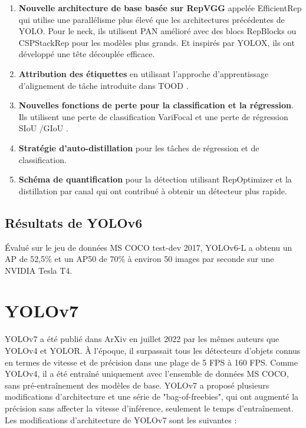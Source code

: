 \documentclass{article}
\begin{document}
\begin{enumerate}
    \item \textbf{Nouvelle architecture de base basée sur RepVGG} \cite{87} appelée EfficientRep qui utilise une parallélisme plus élevé que les architectures précédentes de YOLO. Pour le neck, ils utilisent PAN \cite{62} amélioré avec des blocs RepBlocks \cite{87} ou CSPStackRep \cite{61} pour les modèles plus grands. Et inspirés par YOLOX, ils ont développé une tête découplée efficace.
    \item \textbf{Attribution des étiquettes} en utilisant l'approche d'apprentissage d'alignement de tâche introduite dans TOOD \cite{88}.
    \item \textbf{Nouvelles fonctions de perte pour la classification et la régression}. Ils utilisent une perte de classification VariFocal \cite{89} et une perte de régression SIoU \cite{90}/GIoU \cite{91}.
    \item \textbf{Stratégie d'auto-distillation} pour les tâches de régression et de classification.
    \item \textbf{Schéma de quantification} pour la détection utilisant RepOptimizer \cite{92} et la distillation par canal \cite{93} qui ont contribué à obtenir un détecteur plus rapide.
\end{enumerate}

\subsection{Résultats de YOLOv6}
Évalué sur le jeu de données MS COCO test-dev 2017, YOLOv6-L a obtenu un AP de 52,5\% et un AP50 de 70\% à environ 50 images par seconde sur une NVIDIA Tesla T4.

\section{YOLOv7}
YOLOv7 \cite{94} a été publié dans ArXiv en juillet 2022 par les mêmes auteurs que YOLOv4 et YOLOR. À l'époque, il surpassait tous les détecteurs d'objets connus en termes de vitesse et de précision dans une plage de 5 FPS à 160 FPS. Comme YOLOv4, il a été entraîné uniquement avec l'ensemble de données MS COCO, sans pré-entraînement des modèles de base. YOLOv7 a proposé plusieurs modifications d'architecture et une série de "bag-of-freebies", qui ont augmenté la précision sans affecter la vitesse d'inférence, seulement le temps d'entraînement.
\vspace{.2cm}\\
Les modifications d'architecture de YOLOv7 sont les suivantes :
\end{document}
